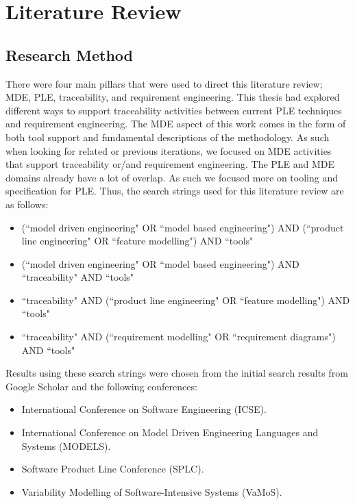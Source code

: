 \chapter{Literature Review}

\section{Research Method}
There were four main pillars that were used to direct this literature review; \ac{MDE}, \ac{PLE}, traceability, and requirement engineering. This thesis had explored different ways to support traceability activities between current \ac{PLE} techniques and requirement engineering. The \ac{MDE} aspect of this work comes in the form of both tool support and fundamental descriptions of the methodology. As such when looking for related or previous iterations, we focused on \ac{MDE} activities that support traceability or/and requirement engineering. The \ac{PLE} and \ac{MDE} domains already have a lot of overlap. As such we focused more on tooling and specification for \ac{PLE}. Thus, the search strings used for this literature review are as follows:
\begin{itemize}
	\item (``model driven engineering" OR ``model based engineering") AND (``product line engineering" OR ``feature modelling") AND ``tools"
	\item (``model driven engineering" OR ``model based engineering") AND ``traceability" AND ``tools"
	\item ``traceability" AND (``product line engineering" OR ``feature modelling") AND ``tools"
	\item ``traceability" AND (``requirement modelling" OR ``requirement diagrams") AND ``tools"
\end{itemize}

Results using these search strings were chosen from the initial search results from Google Scholar and the following conferences:
\begin{itemize}
	\item International Conference on Software Engineering (ICSE). 
	\item International Conference on Model Driven Engineering Languages and Systems (MODELS). 
	\item Software Product Line Conference (SPLC).
	\item Variability Modelling of Software-Intensive Systems (VaMoS).
\end{itemize}

